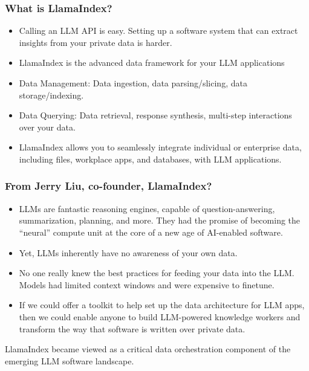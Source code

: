 \begin{frame}[fragile]\frametitle{What is LlamaIndex?}

\begin{itemize}
\item Calling an LLM API is easy. Setting up a software system that can extract insights from your private data is harder.
\item LlamaIndex is the advanced data framework for your LLM applications
\item Data Management: Data ingestion, data parsing/slicing, data storage/indexing.
\item Data Querying: Data retrieval, response synthesis, multi-step interactions over your data.
\item LlamaIndex allows you to seamlessly integrate individual or enterprise data, including files, workplace apps, and databases, with LLM applications. 
\end{itemize}	


\end{frame}

\begin{frame}[fragile]\frametitle{From Jerry Liu, co-founder, LlamaIndex?}

\begin{itemize}
\item LLMs are fantastic reasoning engines, capable of question-answering, summarization, planning, and more. They had the promise of becoming the “neural” compute unit at the core of a new age of AI-enabled software.
\item Yet, LLMs inherently have no awareness of your own data.
\item No one really knew the best practices for feeding your data into the LLM. Models had limited context windows and were expensive to finetune.
\item If we could offer a toolkit to help set up the data architecture for LLM apps, then we could enable anyone to build LLM-powered knowledge workers and transform the way that software is written over private data.
\end{itemize}	

LlamaIndex became viewed as a critical data orchestration component of the emerging LLM software landscape.

\end{frame}


